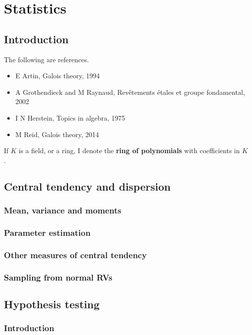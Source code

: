 \documentclass[../Year1.tex]{subfiles}
\begin{document}
\chapter{Statistics}
\renewcommand*\thesection{\arabic{section}}

\section{Introduction}


The following are references.
\begin{itemize}
\item E Artin, Galois theory, 1994
\item A Grothendieck and M Raynaud, Rev\^etements \'etales et groupe fondamental, 2002
\item I N Herstein, Topics in algebra, 1975
\item M Reid, Galois theory, 2014
\end{itemize}

\begin{notation*}
If $ K $ is a field, or a ring, I denote
the \textbf{ring of polynomials} with coefficients in $ K $.
\end{notation*}

\section{Central tendency and dispersion}
\subsection{Mean, variance and moments}
\subsection{Parameter estimation}
\subsection{Other measures of central tendency}
\subsection{Sampling from normal RVs}
\section{Hypothesis testing}
\subsection{Introduction}
\end{document}
